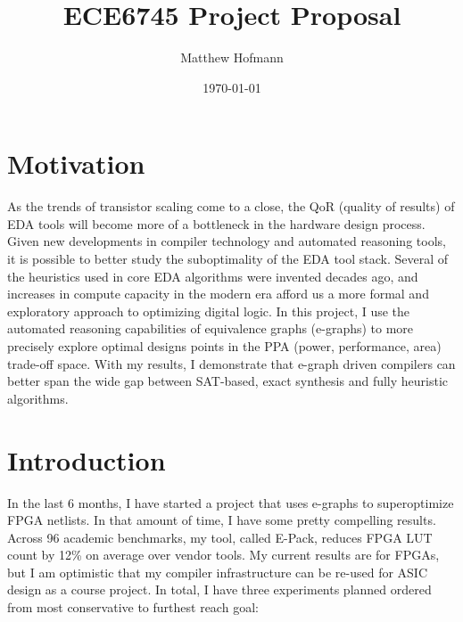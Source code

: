 \documentclass[10pt,letterpaper]{article}
\title{ECE6745 Project Proposal}
\author{Matthew Hofmann}
\date{\today}
\begin{document}
\maketitle


\section{Motivation}\label{sec:motivation}

As the trends of transistor scaling come to a close, the QoR (quality of
results) of EDA tools will become more of a bottleneck in the hardware design
process. Given new developments in compiler technology and automated reasoning
tools, it is possible to better study the suboptimality of the EDA tool stack.
Several of the heuristics used in core EDA algorithms were invented decades
ago, and increases in compute capacity in the modern era afford us a more
formal and exploratory approach to optimizing digital logic. In this project, I
use the automated reasoning capabilities of equivalence graphs (e-graphs) to
more precisely explore optimal designs points in the PPA (power, performance,
area) trade-off space. With my results, I demonstrate that e-graph driven
compilers can better span the wide gap between SAT-based, exact synthesis and
fully heuristic algorithms.

\section{Introduction}\label{sec:intro}

In the last 6 months, I have started a project that uses e-graphs to
superoptimize FPGA netlists. In that amount of time, I have some pretty
compelling results. Across 96 academic benchmarks, my tool, called E-Pack,
reduces FPGA LUT count by 12\% on average over vendor tools. My current results
are for FPGAs, but I am optimistic that my compiler infrastructure can be
re-used for ASIC design as a course project. In total, I have three experiments
planned ordered from most conservative to furthest reach goal:
\end{document}

